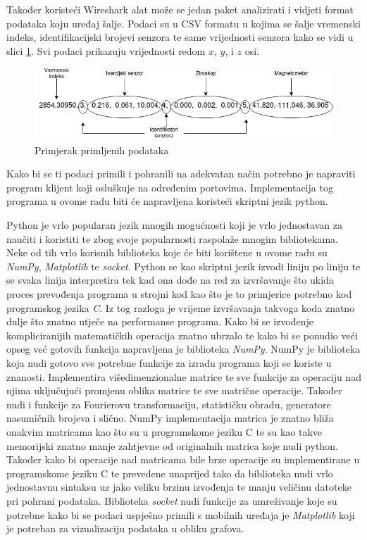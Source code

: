 \documentclass[times, utf8, diplomski]{fer}
\begin{document}
Također koristeći Wireshark alat može se jedan paket analizirati i vidjeti format podataka koju uređaj šalje. Podaci su u CSV formatu u kojima se šalje vremenski indeks,
identifikacijski brojevi senzora te same vrijednosti senzora kako se vidi u slici \ref{datagram}. Svi podaci prikazuju vrijednosti redom $x$, $y$, i $z$ osi.

\begin{figure}[h]
    \includegraphics[width=\textwidth]{datagram.png}
    \caption{Primjerak primljenih podataka}
    \label{datagram}
\end{figure}

Kako bi se ti podaci primili i pohranili na adekvatan način potrebno je napraviti program klijent koji osluškuje na određenim portovima. Implementacija tog programa 
u ovome radu biti će napravljena koristeći skriptni jezik python. 

Python je vrlo popularan jezik mnogih mogućnosti koji je vrlo jednostavan za naučiti i koristiti te zbog svoje popularnosti raspolaže mnogim bibliotekama.
Neke od tih vrlo korisnih biblioteka koje će biti korištene u ovome radu su \textit{NumPy}, \textit{Matplotlib} te \textit{socket}. Python se kao skriptni jezik
izvodi liniju po liniju te se svaka linija interpretira tek kad ona dođe na red za izvršavanje što ukida proces prevođenja programa u strojni kod kao što je to primjerice
potrebno kod programskog jezika \textit{C}. Iz tog razloga je vrijeme izvršavanja takvoga koda znatno dulje što znatno utječe na performanse programa. Kako bi se
izvođenje kompliciranijih matematičkih operacija znatno ubrzalo te kako bi se ponudio veći opseg već gotovih funkcija napravljena je biblioteka \textit{NumPy}.
NumPy je biblioteka koja nudi gotovo sve potrebne funkcije za izradu programa koji se koriste u znanosti. Implementira višedimenzionalne matrice te sve funkcije
za operaciju nad njima uključujući promjenu oblika matrice te sve matrične operacije. Također nudi i funkcije za Fourierovu transformaciju, statističku obradu,
generatore nasumičnih brojeva i slično. NumPy implementacija matrica je znatno bliža onakvim matricama kao što su u programskome jeziku C te su kao takve memorijski
znatno manje zahtjevne od originalnih matrica koje nudi python. Također kako bi operacije nad matricama bile brze operacije su implementirane u programskome jeziku C te
prevedene unaprijed tako da biblioteka nudi vrlo jednostavnu sintaksu uz jako veliku brzinu izvođenja te manju veličinu datoteke pri pohrani podataka.
Biblioteka \textit{socket} nudi funkcije za umreživanje koje su potrebne kako bi se podaci uspješno primili s mobilnih uređaja je \textit{Matplotlib} koji je potreban
za vizualizaciju podataka u obliku grafova.
\end{document}

